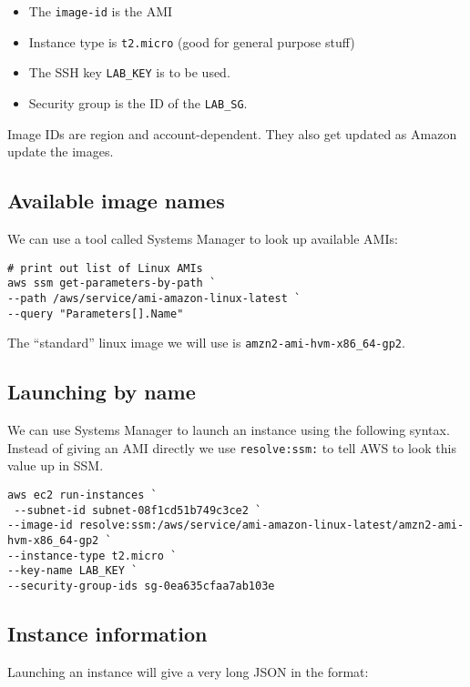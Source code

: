 \begin{itemize}
\item
  The \texttt{image-id} is the AMI
\item
  Instance type is \texttt{t2.micro} (good for general purpose stuff)
\item
  The SSH key \texttt{LAB\_KEY} is to be used.
\item
  Security group is the ID of the \texttt{LAB\_SG}.
\end{itemize}

Image IDs are region and account-dependent. They also get updated as
Amazon update the images.

\subsection{Available image names}\label{available-image-names}

We can use a tool called Systems Manager to look up available AMIs:

\begin{verbatim}
# print out list of Linux AMIs
aws ssm get-parameters-by-path `
--path /aws/service/ami-amazon-linux-latest `
--query "Parameters[].Name"
\end{verbatim}

The ``standard'' linux image we will use is
\texttt{amzn2-ami-hvm-x86\_64-gp2}.

\subsection{Launching by name}\label{launching-by-name}

We can use Systems Manager to launch an instance using the following
syntax. Instead of giving an AMI directly we use \texttt{resolve:ssm:}
to tell AWS to look this value up in SSM.

\begin{verbatim}
aws ec2 run-instances `
 --subnet-id subnet-08f1cd51b749c3ce2 `
--image-id resolve:ssm:/aws/service/ami-amazon-linux-latest/amzn2-ami-hvm-x86_64-gp2 `
--instance-type t2.micro `
--key-name LAB_KEY `
--security-group-ids sg-0ea635cfaa7ab103e
\end{verbatim}

\subsection{Instance information}\label{instance-information}

Launching an instance will give a very long JSON in the format:

